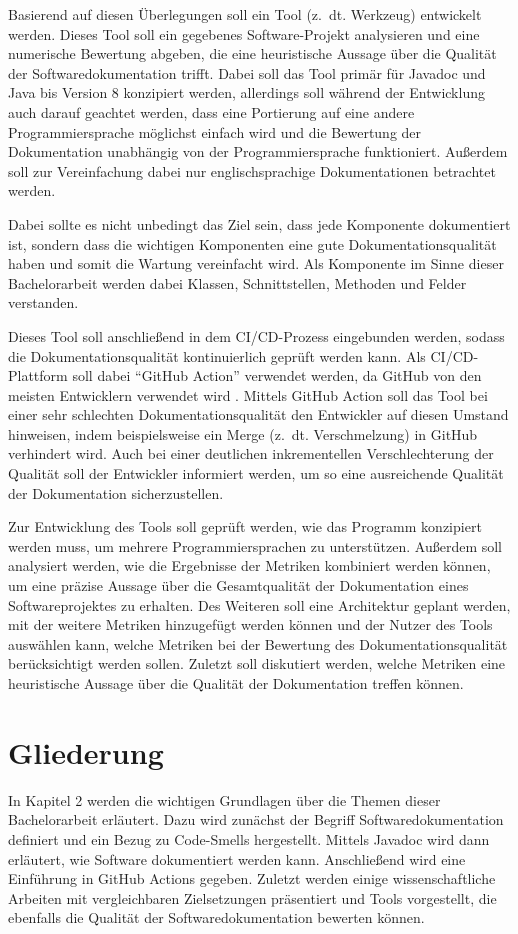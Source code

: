 \hfill

Basierend auf diesen Überlegungen soll ein Tool (z.~dt. Werkzeug) entwickelt werden. Dieses Tool soll ein gegebenes Software-Projekt analysieren und eine numerische Bewertung abgeben, die eine heuristische Aussage über die Qualität der Softwaredokumentation trifft.  Dabei soll das Tool primär für Javadoc und Java bis Version 8 konzipiert werden, allerdings soll während der Entwicklung auch darauf geachtet werden, dass eine Portierung auf eine andere Programmiersprache möglichst einfach wird und die Bewertung der Dokumentation unabhängig von der Programmiersprache funktioniert. Außerdem soll zur Vereinfachung dabei nur englischsprachige Dokumentationen betrachtet werden.

Dabei sollte es nicht unbedingt das Ziel sein, dass jede Komponente dokumentiert ist, sondern dass die wichtigen Komponenten eine gute Dokumentationsqualität haben und somit die Wartung vereinfacht wird.  Als Komponente im Sinne dieser Bachelorarbeit werden dabei Klassen, Schnittstellen, Methoden und Felder verstanden. 

Dieses Tool soll anschließend in dem \ac{CI/CD}-Prozess eingebunden werden, sodass die Dokumentationsqualität kontinuierlich geprüft werden kann. Als \ac{CI/CD}-Plattform soll dabei \enquote{GitHub Action} verwendet werden, da GitHub von den meisten Entwicklern verwendet wird \cite{github_popular}. Mittels GitHub Action soll das Tool bei einer sehr schlechten Dokumentationsqualität den Entwickler auf diesen Umstand hinweisen, indem beispielsweise ein Merge (z.~dt. Verschmelzung) in GitHub verhindert wird. Auch bei einer deutlichen inkrementellen Verschlechterung der Qualität soll der Entwickler informiert werden, um so eine ausreichende Qualität der Dokumentation sicherzustellen. 

Zur Entwicklung des Tools soll geprüft werden, wie das Programm konzipiert werden muss, um mehrere Programmiersprachen zu unterstützen. Außerdem soll analysiert werden, wie die Ergebnisse der Metriken kombiniert werden können, um eine präzise Aussage über die Gesamtqualität der Dokumentation eines Softwareprojektes zu erhalten. Des Weiteren soll eine Architektur geplant werden, mit der weitere Metriken hinzugefügt werden können und der Nutzer des Tools auswählen kann, welche Metriken bei der Bewertung des Dokumentationsqualität berücksichtigt werden sollen. Zuletzt soll diskutiert werden, welche Metriken eine heuristische Aussage über die Qualität der Dokumentation treffen können. 


\section{Gliederung}
In Kapitel 2 werden die wichtigen Grundlagen über die Themen dieser Bachelorarbeit erläutert. Dazu  wird zunächst der Begriff Softwaredokumentation definiert und ein Bezug zu Code-Smells hergestellt. Mittels Javadoc wird dann erläutert, wie Software dokumentiert werden kann. Anschließend wird eine Einführung in GitHub Actions gegeben. Zuletzt werden einige wissenschaftliche Arbeiten mit vergleichbaren Zielsetzungen präsentiert und Tools vorgestellt, die ebenfalls die Qualität der Softwaredokumentation bewerten können.

